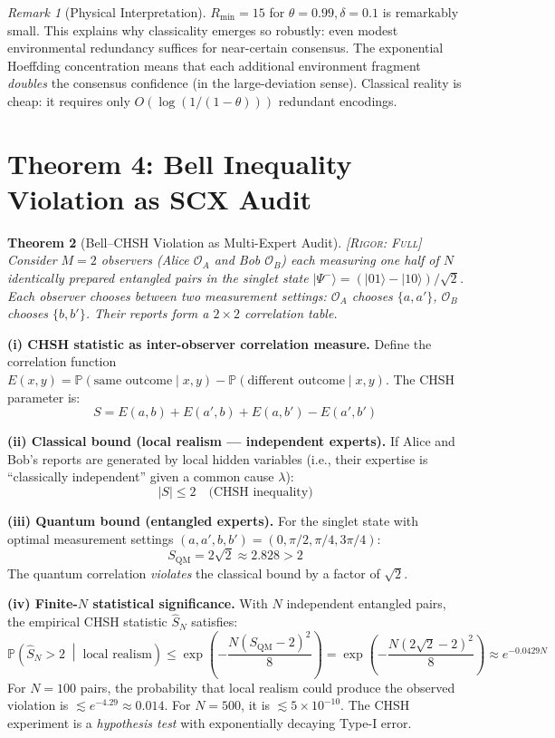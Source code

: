 \documentclass[11pt,a4paper]{article}
\newcommand{\ket}[1]{|#1\rangle}
\newtheorem{theorem}{Theorem}[section]
\theoremstyle{definition}
\theoremstyle{remark}
\newtheorem{remark}[theorem]{Remark}
\newcommand{\Pbb}{\mathbb{P}}
\newcommand{\Obs}{\mathcal{O}}
\newcommand{\rigorFull}{\textsc{[Rigor: Full]}}
\begin{document}
\begin{remark}[Physical Interpretation]
$R_{\min} = 15$ for $\theta = 0.99, \delta = 0.1$ is remarkably small. This explains why classicality emerges so robustly: even modest environmental redundancy suffices for near-certain consensus. The exponential Hoeffding concentration means that each additional environment fragment \emph{doubles} the consensus confidence (in the large-deviation sense). Classical reality is cheap: it requires only $O(\log(1/(1-\theta)))$ redundant encodings.
\end{remark}

\section{Theorem 4: Bell Inequality Violation as SCX Audit}

\begin{theorem}[Bell--CHSH Violation as Multi-Expert Audit]
\label{thm:bell-audit}
\rigorFull
Consider $M=2$ observers (Alice $\Obs_A$ and Bob $\Obs_B$) each measuring one half of $N$ identically prepared entangled pairs in the singlet state $\ket{\Psi^-} = (\ket{01} - \ket{10})/\sqrt{2}$. Each observer chooses between two measurement settings: $\Obs_A$ chooses $\{a, a'\}$, $\Obs_B$ chooses $\{b, b'\}$. Their reports form a $2 \times 2$ correlation table.
\end{theorem}

\medskip
\noindent\textbf{(i) CHSH statistic as inter-observer correlation measure.}
Define the correlation function $E(x, y) = \Pbb(\text{same outcome} \mid x, y) - \Pbb(\text{different outcome} \mid x, y)$. The CHSH parameter is:
\[
S = E(a, b) + E(a', b) + E(a, b') - E(a', b')
\]

\noindent\textbf{(ii) Classical bound (local realism --- independent experts).}
If Alice and Bob's reports are generated by local hidden variables (i.e., their expertise is ``classically independent'' given a common cause $\lambda$):
\[
|S| \leq 2 \quad \text{(CHSH inequality)}
\]

\noindent\textbf{(iii) Quantum bound (entangled experts).}
For the singlet state with optimal measurement settings $(a, a', b, b') = (0, \pi/2, \pi/4, 3\pi/4)$:
\[
S_{\text{QM}} = 2\sqrt{2} \approx 2.828 > 2
\]
The quantum correlation \emph{violates} the classical bound by a factor of $\sqrt{2}$.

\noindent\textbf{(iv) Finite-$N$ statistical significance.}
With $N$ independent entangled pairs, the empirical CHSH statistic $\hat{S}_N$ satisfies:
\[
\Pbb\!\left(\hat{S}_N > 2 \;\middle|\; \text{local realism}\right) \leq \exp\!\left(-\frac{N(S_{\text{QM}} - 2)^2}{8}\right) = \exp\!\left(-\frac{N(2\sqrt{2} - 2)^2}{8}\right) \approx e^{-0.0429 N}
\]
For $N = 100$ pairs, the probability that local realism could produce the observed violation is $\lesssim e^{-4.29} \approx 0.014$. For $N = 500$, it is $\lesssim 5 \times 10^{-10}$. The CHSH experiment is a \emph{hypothesis test} with exponentially decaying Type-I error.
\end{document}

